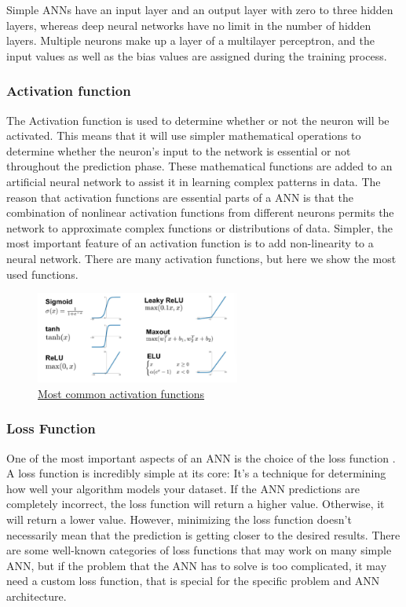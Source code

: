 Simple ANNs have an input layer and an output layer with zero to three hidden layers, whereas deep neural networks have no limit in the number of hidden layers. Multiple neurons make up a layer of a multilayer perceptron, and the input values as well as the bias values are assigned
during the training process.



\subsubsection*{Activation function}
The Activation function is used to determine whether or not the neuron will be activated. This means that it will use simpler mathematical operations to determine whether the neuron's input to the network is essential or not throughout the prediction phase. These mathematical functions are added to an artificial neural network to assist it in learning complex patterns in data. The reason that activation functions are essential parts of a ANN is that the combination of nonlinear activation functions from different neurons permits the network to approximate complex functions or distributions of data. Simpler, the most important feature of an activation function is to add non-linearity to a neural network. There are many activation functions, but here we show the most used functions.

 \begin{figure}[h]
	\centering
	\includegraphics[width=0.6\textwidth]{figures/background/ActivationFunctions.png}
	\captionsetup{labelformat=empty}
	\caption{\href{https://datasciencepreparation.com/blog/articles/what-is-an-activation-function-what-are-commonly-used-activation-functions/}
	{Most common activation functions}}
\end{figure}

\subsubsection*{Loss Function}

One of the most important aspects of an ANN is the choice of the loss function \cite{The importance of the loss function in option valuation} . A loss function is incredibly simple at its core: It's a technique for determining how well your algorithm models your dataset. If the ANN predictions are completely incorrect, the loss function will return a higher value. Otherwise, it will return a lower value. However, minimizing the loss function doesn't necessarily mean that the prediction is getting closer to the desired results. There are some well-known categories of loss functions that may work on many simple ANN, but if the problem that the ANN has to solve is too complicated, it may need a custom loss function, that is special for the specific problem and ANN architecture. \\

